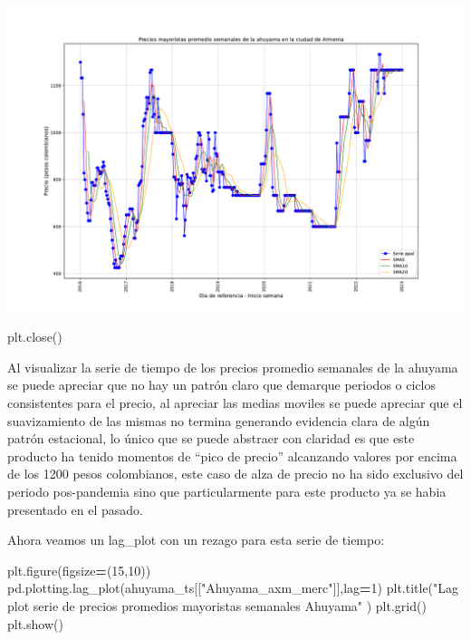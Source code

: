 \documentclass[
]{book}
\newenvironment{Shaded}{\begin{snugshade}}{\end{snugshade}}
\newcommand{\DecValTok}[1]{\textcolor[rgb]{0.00,0.00,0.81}{#1}}
\newcommand{\NormalTok}[1]{#1}
\newcommand{\OperatorTok}[1]{\textcolor[rgb]{0.81,0.36,0.00}{\textbf{#1}}}
\newcommand{\StringTok}[1]{\textcolor[rgb]{0.31,0.60,0.02}{#1}}
\begin{document}
\includegraphics{bookdown-demo_files/figure-latex/unnamed-chunk-45-1.pdf}

\begin{Shaded}
\begin{Highlighting}[]
\NormalTok{plt.close()}
\end{Highlighting}
\end{Shaded}

Al visualizar la serie de tiempo de los precios promedio semanales de la ahuyama se puede apreciar que no hay un patrón claro que demarque periodos o ciclos consistentes para el precio, al apreciar las medias moviles se puede apreciar que el suavizamiento de las mismas no termina generando evidencia clara de algún patrón estacional, lo único que se puede abstraer con claridad es que este producto ha tenido momentos de ``pico de precio'' alcanzando valores por encima de los 1200 pesos colombianos, este caso de alza de precio no ha sido exclusivo del periodo pos-pandemia sino que particularmente para este producto ya se habia presentado en el pasado.

Ahora veamos un lag\_plot con un rezago para esta serie de tiempo:

\begin{Shaded}
\begin{Highlighting}[]

\NormalTok{plt.figure(figsize}\OperatorTok{=}\NormalTok{(}\DecValTok{15}\NormalTok{,}\DecValTok{10}\NormalTok{))}
\NormalTok{pd.plotting.lag\_plot(ahuyama\_ts[[}\StringTok{"Ahuyama\_axm\_merc"}\NormalTok{]],lag}\OperatorTok{=}\DecValTok{1}\NormalTok{)}
\NormalTok{plt.title(}\StringTok{"Lag plot serie de precios promedios mayoristas semanales Ahuyama"}\NormalTok{ )}
\NormalTok{plt.grid()}
\NormalTok{plt.show()}
\end{Highlighting}
\end{Shaded}
\end{document}
